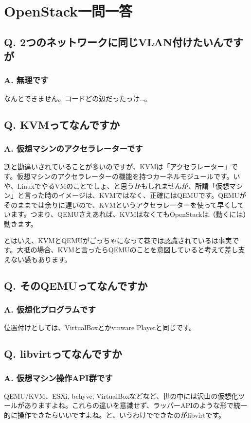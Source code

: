 \documentclass[9pt,b5paper,tombo,openany]{jsbook}
\begin{document}
\chapter{OpenStack一問一答}

\section*{Q. 2つのネットワークに同じVLAN付けたいんですが}
\subsection*{A. 無理です}
なんとできません。コードどの辺だったっけ…。

\section*{Q. KVMってなんですか}
\subsection*{A. 仮想マシンのアクセラレーターです}
割と勘違いされていることが多いのですが、KVMは「アクセラレーター」です。仮想マシンのアクセラレーターの機能を持つカーネルモジュールです。いや、LinuxでやるVMのことでしょ、と思うかもしれませんが、所謂「仮想マシン」と言った時のイメージは、KVMではなく、正確にはQEMUです。QEMUがそのままでは余りに遅いので、KVMというアクセラレーターを使って早くしています。つまり、QEMUさえあれば、KVMはなくてもOpenStackは（動くには）動きます。

とはいえ、KVMとQEMUがごっちゃになって巷では認識されているは事実です。大抵の場合、KVMと言ったらQEMUのことを意図していると考えて差し支えない感もあります。

\section*{Q. そのQEMUってなんですか}
\subsection*{A. 仮想化プログラムです}
位置付けとしては、VirtualBoxとかvmware Playerと同じです。

\section*{Q. libvirtってなんですか}
\subsection*{A. 仮想マシン操作API群です}
QEMU/KVM、ESXi, behyve, VirtualBoxなどなど、世の中には沢山の仮想化ツールがありますよね。これらの違いを意識せず、ラッパーAPIのような形で統一的に操作できたらいいですよね。と、いうわけでできたのがlibvirtです。
\end{document}
